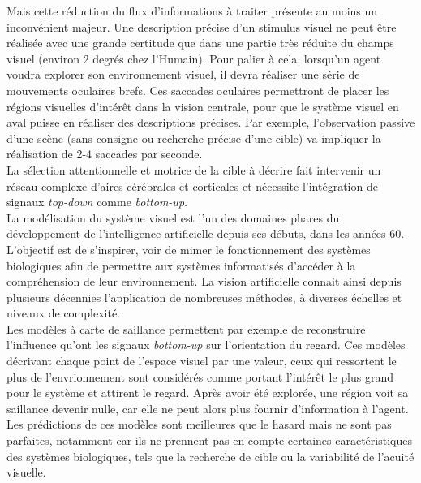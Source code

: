 Mais cette réduction du flux d'informations à traiter présente au moins un inconvénient majeur. 
Une description précise d'un stimulus visuel ne peut être réalisée avec une grande certitude que dans une partie très réduite du champs visuel (environ 2 degrés chez l'Humain).
Pour palier à cela, lorsqu'un agent voudra explorer son environnement visuel, il devra réaliser une série de mouvements oculaires brefs. Ces saccades oculaires permettront de placer les régions visuelles d'intérêt dans la vision centrale, pour que le système visuel en aval puisse en réaliser des descriptions précises. Par exemple, l'observation passive d'une scène (sans consigne ou recherche précise d'une cible) va impliquer la réalisation de 2-4 saccades par seconde. \autocite{Krauzlis2017, Werner2014} \\
La sélection attentionnelle et motrice de la cible à décrire fait intervenir un réseau complexe d'aires cérébrales et corticales et nécessite l'intégration de signaux \textit{top-down} comme \textit{bottom-up}. \autocite{Werner2014} \\


La modélisation du système visuel est l'un des domaines phares du développement de l'intelligence artificielle depuis ses débuts, dans les années 60.
L'objectif est de s'inspirer, voir de mimer le fonctionnement des systèmes biologiques afin de permettre aux systèmes informatisés d'accéder à la compréhension de leur environnement.
La vision artificielle connait ainsi depuis plusieurs décennies l'application de nombreuses méthodes, à diverses échelles et niveaux de complexité.\autocite{Werner2014} \\
Les modèles à carte de saillance permettent par exemple de reconstruire l'influence qu'ont les signaux \textit{bottom-up} sur l'orientation du regard. 
Ces modèles décrivant chaque point de l'espace visuel par une valeur, ceux qui ressortent le plus de l'envrionnement sont considérés comme portant l'intérêt le plus grand pour le système et attirent le regard. 
Après avoir été explorée, une région voit sa saillance devenir nulle, car elle ne peut alors plus fournir d'information à l'agent.
Les prédictions de ces modèles sont meilleures que le hasard mais ne sont pas parfaites, notamment car ils ne prennent pas en compte certaines caractéristiques des systèmes biologiques, tels que la recherche de cible ou la variabilité de l'acuité visuelle. \autocite{Werner2014} \\

